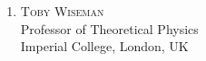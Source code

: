 \begin{enumerate}
\item \textsc{Toby Wiseman} \\
Professor of Theoretical Physics  \\
Imperial College, London, UK  \\
 \\ 
\end{enumerate} 






 
 


